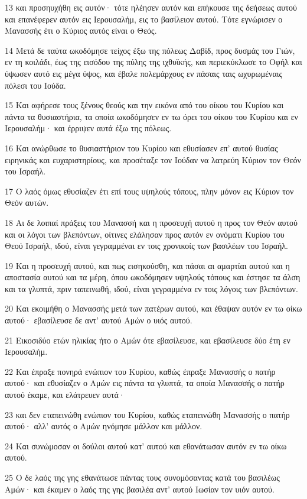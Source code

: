 \par 13 και προσηυχήθη εις αυτόν· τότε ηλέησεν αυτόν και επήκουσε της δεήσεως αυτού και επανέφερεν αυτόν εις Ιερουσαλήμ, εις το βασίλειον αυτού. Τότε εγνώρισεν ο Μανασσής έτι ο Κύριος αυτός είναι ο Θεός.
\par 14 Μετά δε ταύτα ωκοδόμησε τείχος έξω της πόλεως Δαβίδ, προς δυσμάς του Γιών, εν τη κοιλάδι, έως της εισόδου της πύλης της ιχθυϊκής, και περιεκύκλωσε το Οφήλ και ύψωσεν αυτό εις μέγα ύψος, και έβαλε πολεμάρχους εν πάσαις ταις ωχυρωμέναις πόλεσι του Ιούδα.
\par 15 Και αφήρεσε τους ξένους θεούς και την εικόνα από του οίκου του Κυρίου και πάντα τα θυσιαστήρια, τα οποία ωκοδόμησεν εν τω όρει του οίκου του Κυρίου και εν Ιερουσαλήμ· και έρριψεν αυτά έξω της πόλεως.
\par 16 Και ανώρθωσε το θυσιαστήριον του Κυρίου και εθυσίασεν επ' αυτού θυσίας ειρηνικάς και ευχαριστηρίους, και προσέταξε τον Ιούδαν να λατρεύη Κύριον τον Θεόν του Ισραήλ.
\par 17 Ο λαός όμως εθυσίαζεν έτι επί τους υψηλούς τόπους, πλην μόνον εις Κύριον τον Θεόν αυτών.
\par 18 Αι δε λοιπαί πράξεις του Μανασσή και η προσευχή αυτού η προς τον Θεόν αυτού και οι λόγοι των βλεπόντων, οίτινες ελάλησαν προς αυτόν εν ονόματι Κυρίου του Θεού Ισραήλ, ιδού, είναι γεγραμμέναι εν τοις χρονικοίς των βασιλέων του Ισραήλ.
\par 19 Και η προσευχή αυτού, και πως εισηκούσθη, και πάσαι αι αμαρτίαι αυτού και η αποστασία αυτού και τα μέρη, όπου ωκοδόμησεν υψηλούς τόπους και έστησε τα άλση και τα γλυπτά, πριν ταπεινωθή, ιδού, είναι γεγραμμένα εν τοις λόγοις των βλεπόντων.
\par 20 Και εκοιμήθη ο Μανασσής μετά των πατέρων αυτού, και έθαψαν αυτόν εν τω οίκω αυτού· εβασίλευσε δε αντ' αυτού Αμών ο υιός αυτού.
\par 21 Εικοσιδύο ετών ηλικίας ήτο ο Αμών ότε εβασίλευσε, και εβασίλευσε δύο έτη εν Ιερουσαλήμ.
\par 22 Και έπραξε πονηρά ενώπιον του Κυρίου, καθώς έπραξε Μανασσής ο πατήρ αυτού· και εθυσίαζεν ο Αμών εις πάντα τα γλυπτά, τα οποία Μανασσής ο πατήρ αυτού έκαμε, και ελάτρευεν αυτά·
\par 23 και δεν εταπεινώθη ενώπιον του Κυρίου, καθώς εταπεινώθη Μανασσής ο πατήρ αυτού· αλλ' αυτός ο Αμών ηνόμησε μάλλον και μάλλον.
\par 24 Και συνώμοσαν οι δούλοι αυτού κατ' αυτού και εθανάτωσαν αυτόν εν τω οίκω αυτού.
\par 25 Ο δε λαός της γης εθανάτωσε πάντας τους συνομόσαντας κατά του βασιλέως Αμών· και έκαμεν ο λαός της γης βασιλέα αντ' αυτού Ιωσίαν τον υιόν αυτού.

